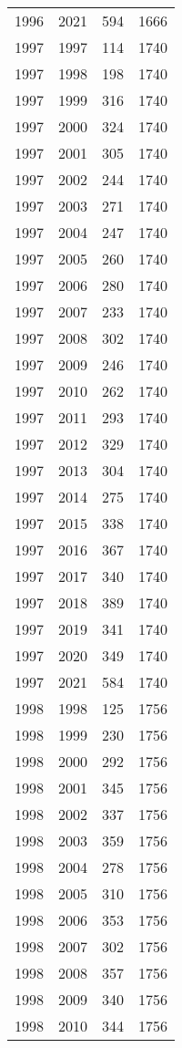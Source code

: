 \documentclass[
  10pt,
  letterpaper,
  DIV=11,
  numbers=noendperiod,
  twoside]{scrartcl}
\begin{document}
\begin{longtable}[]{@{}rrrr@{}}
1996 & 2021 & 594 & 1666 \\
1997 & 1997 & 114 & 1740 \\
1997 & 1998 & 198 & 1740 \\
1997 & 1999 & 316 & 1740 \\
1997 & 2000 & 324 & 1740 \\
1997 & 2001 & 305 & 1740 \\
1997 & 2002 & 244 & 1740 \\
1997 & 2003 & 271 & 1740 \\
1997 & 2004 & 247 & 1740 \\
1997 & 2005 & 260 & 1740 \\
1997 & 2006 & 280 & 1740 \\
1997 & 2007 & 233 & 1740 \\
1997 & 2008 & 302 & 1740 \\
1997 & 2009 & 246 & 1740 \\
1997 & 2010 & 262 & 1740 \\
1997 & 2011 & 293 & 1740 \\
1997 & 2012 & 329 & 1740 \\
1997 & 2013 & 304 & 1740 \\
1997 & 2014 & 275 & 1740 \\
1997 & 2015 & 338 & 1740 \\
1997 & 2016 & 367 & 1740 \\
1997 & 2017 & 340 & 1740 \\
1997 & 2018 & 389 & 1740 \\
1997 & 2019 & 341 & 1740 \\
1997 & 2020 & 349 & 1740 \\
1997 & 2021 & 584 & 1740 \\
1998 & 1998 & 125 & 1756 \\
1998 & 1999 & 230 & 1756 \\
1998 & 2000 & 292 & 1756 \\
1998 & 2001 & 345 & 1756 \\
1998 & 2002 & 337 & 1756 \\
1998 & 2003 & 359 & 1756 \\
1998 & 2004 & 278 & 1756 \\
1998 & 2005 & 310 & 1756 \\
1998 & 2006 & 353 & 1756 \\
1998 & 2007 & 302 & 1756 \\
1998 & 2008 & 357 & 1756 \\
1998 & 2009 & 340 & 1756 \\
1998 & 2010 & 344 & 1756 \\

\end{longtable}
\end{document}
